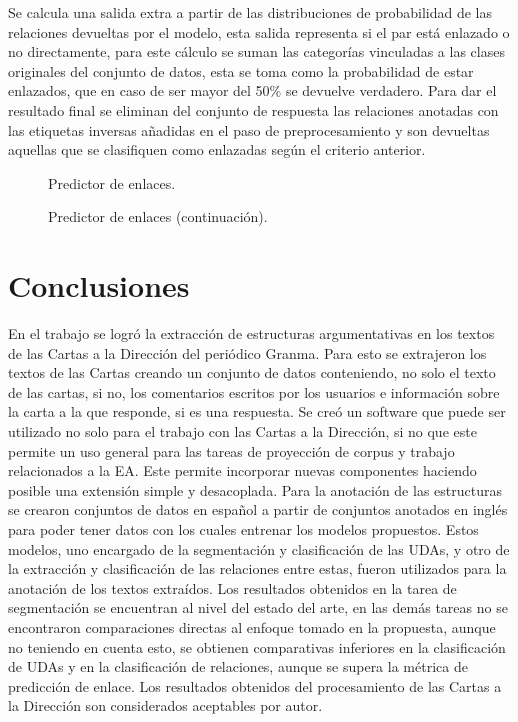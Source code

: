 \documentclass[a4paper,11pt,twocolumn,twoside]{article}
\begin{document}
Se calcula una salida extra a partir de las distribuciones de probabilidad de las relaciones 
devueltas por el modelo, esta salida representa si el par está enlazado o no directamente, para este cálculo se 
suman las categorías vinculadas a las clases originales del conjunto de datos, esta se toma como la probabilidad de estar 
enlazados, que en caso de ser mayor del 50\% se devuelve verdadero. Para dar el resultado final se eliminan del 
conjunto de respuesta las relaciones anotadas con las etiquetas inversas añadidas en el paso de preprocesamiento 
y son devueltas aquellas que se clasifiquen como enlazadas según el criterio anterior.

\newpage

\begin{figure}[h]
    \centering
    
    \caption{Predictor de enlaces.}
    \label{fig:link_predictor_model1}
\end{figure}
\begin{figure}[h]
    \centering
    
    \caption{Predictor de enlaces (continuación).}
    \label{fig:link_predictor_model2}
\end{figure}

\section{Conclusiones}

En el trabajo se logró la extracción de estructuras argumentativas en los textos de las 
Cartas a la Dirección del periódico Granma. Para esto se 
extrajeron los textos de las Cartas creando un conjunto de datos
conteniendo, no solo el texto de las cartas, si no, los comentarios 
escritos por los usuarios e información sobre la carta a la que responde, si es una respuesta.
Se creó un software que puede ser utilizado no solo para el trabajo con las Cartas a la Dirección, si no
que este permite un uso general para las tareas de proyección de corpus y trabajo relacionados a la EA.
Este permite incorporar nuevas componentes haciendo posible una extensión simple y desacoplada. 
Para la anotación de las estructuras se crearon conjuntos de datos en español a partir de conjuntos 
anotados en inglés para poder 
tener datos con los cuales entrenar los modelos propuestos. Estos modelos, uno encargado 
de la segmentación y clasificación de las UDAs, y otro de la extracción y clasificación de las 
relaciones entre estas, fueron utilizados para la anotación de los textos extraídos.
Los resultados obtenidos en la tarea de segmentación se encuentran al nivel del estado del arte,
en las demás tareas no se encontraron comparaciones directas al enfoque tomado en la propuesta,
aunque no teniendo en cuenta esto, se obtienen comparativas inferiores en la clasificación
de UDAs y en la clasificación de relaciones, aunque se supera la métrica de predicción de enlace. 
Los resultados obtenidos del procesamiento de las Cartas a la Dirección son considerados 
aceptables por autor. 
\end{document}
